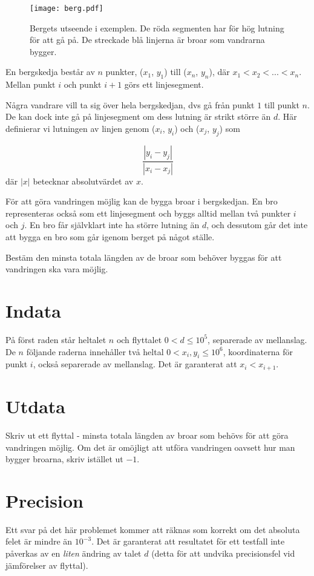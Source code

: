 
\begin{figure}[ht!]
\centering
\texttt{[image: berg.pdf]}
\caption{Bergets utseende i exemplen. De röda segmenten har för hög lutning för att gå på. De streckade blå linjerna är broar som vandrarna bygger.}
\label{overflow}
\end{figure}

En bergskedja består av $n$ punkter, ($x_1$, $y_1$) till ($x_n$, $y_n$), där $x_1 < x_2 < ... < x_n$. Mellan punkt $i$ och punkt $i+1$ görs ett linjesegment.

Några vandrare vill ta sig över hela bergskedjan, dvs gå från punkt $1$ till punkt $n$. De kan dock inte gå på linjesegment om dess lutning är strikt större än $d$. Här definierar vi lutningen av linjen genom ($x_i$, $y_i$) och ($x_j$, $y_j$) som

$$
\frac{|y_i - y_j|}{|x_i - x_j|}
$$
där $|x|$ betecknar absolutvärdet av $x$.

För att göra vandringen möjlig kan de bygga broar i bergskedjan. En bro representeras också som ett linjesegment och byggs alltid mellan två punkter $i$ och $j$. En bro får självklart inte ha större lutning än $d$, och dessutom går det inte att bygga en bro som går igenom berget på något ställe.

Bestäm den minsta totala längden av de broar som behöver byggas för att vandringen ska vara möjlig.

\section*{Indata}
På först raden står heltalet $n$ och flyttalet $0 < d \le 10^5$, separerade av mellanslag.
De $n$ följande raderna innehåller två heltal $0 < x_i, y_i \le 10^6$, koordinaterna för punkt $i$, också separerade av mellanslag. Det är garanterat att $x_i < x_{i+1}$.

\section*{Utdata}
Skriv ut ett flyttal - minsta totala längden av broar som behövs för att göra vandringen möjlig.
Om det är omöjligt att utföra vandringen oavsett hur man bygger broarna, skriv istället ut $-1$.

\section*{Precision}
Ett svar på det här problemet kommer att räknas som korrekt om det absoluta felet är mindre än $10^{-3}$. Det är garanterat att resultatet för ett testfall inte påverkas av en \emph{liten} ändring av talet $d$ (detta för att undvika precisionsfel vid jämförelser av flyttal).

